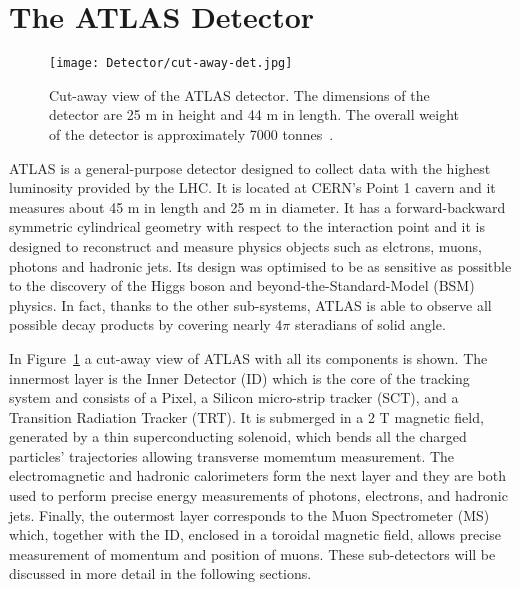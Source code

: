 	\section{The ATLAS Detector}
	\label{sec:det}

		\begin{figure}[!htb]
			\texttt{[image: Detector/cut-away-det.jpg]}
			\caption{Cut-away view of the ATLAS detector. The dimensions of the detector are 25 m in height and 44 m in length. The overall weight of the detector is approximately 7000 tonnes~\cite{Lefevre2008}.}
			\label{fig:cut-away-det}
		\end{figure}


		ATLAS is a general-purpose detector designed to collect data with the highest luminosity provided by the LHC. It is located at CERN's Point 1 cavern and it measures about 45 m in length and 25 m in diameter. It has a forward-backward symmetric cylindrical geometry with respect to the interaction point and it is designed to reconstruct and measure physics objects such as elctrons, muons, photons and hadronic jets. Its design was optimised to be as sensitive as possitble to the discovery of the Higgs boson and beyond-the-Standard-Model (BSM) physics. In fact, thanks to the other sub-systems, ATLAS is able to observe all possible decay products by covering nearly $4\pi$ steradians of solid angle.

		In Figure~\ref{fig:cut-away-det} a cut-away view of ATLAS with all its components is shown. The innermost layer is the Inner Detector (ID) which is the core of the tracking system and consists of a Pixel, a Silicon micro-strip tracker (SCT), and a Transition Radiation Tracker (TRT). It is submerged in a 2 T magnetic field, generated by a thin superconducting solenoid, which bends all the charged particles' trajectories allowing transverse momemtum measurement. The electromagnetic and hadronic calorimeters form the next layer and they are both used to perform precise energy measurements of photons, electrons, and hadronic jets. Finally, the outermost layer corresponds to the Muon Spectrometer (MS) which, together with the ID, enclosed in a toroidal magnetic field, allows precise measurement of momentum and position of muons. These sub-detectors will be discussed in more detail in the following sections. 
	

